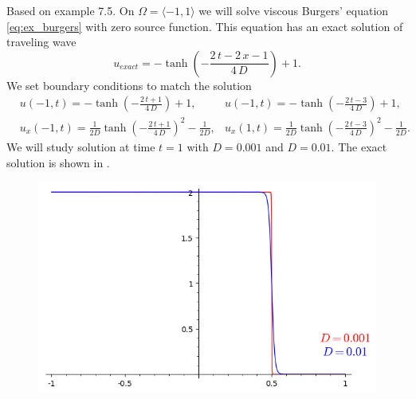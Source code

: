\begin{example}
\label{ex:burgers_hest}
Based on \cite[Section 7.1.2, Example 7.5,  p. 255]{Hesthaven2008} example 7.5.
On $\Omega = \langle -1, 1 \rangle$ we will solve viscous Burgers’ equation 
\eqref{eq:ex_burgers} with zero source function.
This equation has an exact solution of traveling wave 
\begin{equation}
	u_{exact} =  -\tanh\left(-\frac{2 \, t - 2 \, x - 1}{4 \,D}\right) + 1.
\end{equation}
We set boundary conditions to match the solution
\begin{equation}
	\begin{aligned}
	& u(-1, t) = -\tanh\left(-\frac{2 \, t  + 1}{4 \,D}\right) + 1, 
	&  u(-1, t) = -\tanh\left(-\frac{2 \, t - 3}{4 \,D}\right) + 1,\\
	&u_x(-1, t) = \frac{1}{2D}\tanh\left(-\frac{2 \, t + 1}{4 \, D}\right)^{2} - 
	\frac{1}{2D}, 
	&u_x(1, t) = \frac{1}{2D}\tanh\left(-\frac{2 \, t - 3}{4 \, D}\right)^{2} - 
	\frac{1}{2D}.
	\end{aligned}
\end{equation}
We will study solution at time $t = 1$ with $D = 0.001$ and $D = 0.01$. The exact 
solution is shown in .
\begin{figure}[h]
	\centering
%	
	\includegraphics[scale=0.5]{../figs/burgers_hesthaven_exact_t1.png}

\end{figure}
\end{example}
